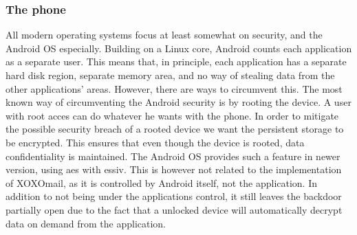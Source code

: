 \subsubsection{The phone}
All modern operating systems focus at least somewhat on security, and the Android OS especially. Building on a Linux core, Android counts each application as a separate user. This means that, in principle, each application has a separate hard disk region, separate memory area, and no way of stealing data from the other applications’ areas. However, there are ways to circumvent this.
\newline
\newline
The most known way of circumventing the Android security is by rooting the device. A user with root acces can do whatever he wants with the phone.
\newline
\newline
In order to mitigate the possible security breach of a rooted device we want the persistent storage to be encrypted. This ensures that even though the device is rooted, data confidentiality is maintained. The Android OS provides such a feature in newer version, using \gls{aes} with \gls{essiv}. This is however not related to the implementation of XOXOmail, as it is controlled by Android itself, not the application. In addition to not being under the applications control, it still leaves the backdoor partially open due to the fact that a unlocked device will automatically decrypt data on demand from the application. 
\newline
\newline

